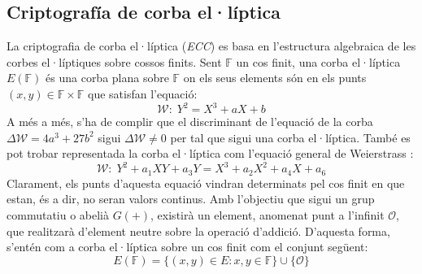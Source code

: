 \documentclass{article}
\begin{document}
\subsection{Criptografía de corba el·líptica}\label{sec:cripto-ecc}
La criptografia de corba el·líptica (\textit{ECC}) es basa en l'estructura algebraica de les corbes el·líptiques sobre cossos finits. Sent $\mathbb{F}$ un cos finit, 
una corba el·líptica $E(\mathbb{F})$ és una corba plana sobre $\mathbb{F}$ on els seus elements són en els punts $(x, y) \in \mathbb{F} \times \mathbb{F}$ que satisfan l'equació:
\[\mathcal{W} : \; Y^2 = X^3 + aX + b\]
A més a més, s'ha de complir que el discriminant de l'equació de la corba $\Delta \mathcal{W} = 4a^3 + 27b^2$ sigui $\Delta \mathcal{W} \neq 0$ per tal que sigui una corba el·líptica. També es pot trobar representada la corba el·líptica com l'equació general de Weierstrass \cite{ecc:normal-form}:
\[\mathcal{W} : \; Y^2 + a_1XY + a_3Y = X^3 + a_2X^2 + a_4X + a_6 \]
Clarament, els punts d'aquesta equació vindran determinats pel cos finit en que estan, és a dir, no seran valors continus. Amb l'objectiu que sigui un grup commutatiu o abelià $G(+)$, existirà un element, anomenat punt a l'infinit $\mathcal{O}$, que realitzarà d'element neutre sobre la operació d'addició. D'aquesta forma, s'entén com a corba el·líptica sobre un cos finit com el conjunt següent:
\[ E(\mathbb{F}) = \{(x, y) \in E : x, y \in \mathbb{F} \} \cup \{\mathcal{O}\}\]
\end{document}
